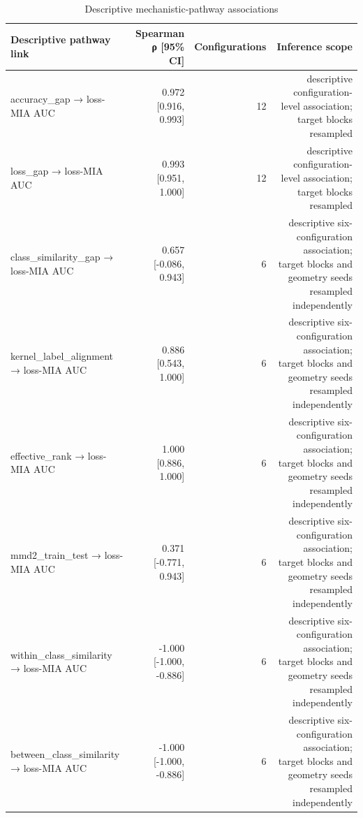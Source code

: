 \begin{table}
\caption{Descriptive mechanistic-pathway associations}
\label{tab:satml_pathway}
\begin{tabular}{lrrr}
\toprule
Descriptive pathway link & Spearman ρ [95\% CI] & Configurations & Inference scope \\
\midrule
accuracy\_gap → loss-MIA AUC & 0.972 [0.916, 0.993] & 12 & descriptive configuration-level association; target blocks resampled \\
loss\_gap → loss-MIA AUC & 0.993 [0.951, 1.000] & 12 & descriptive configuration-level association; target blocks resampled \\
class\_similarity\_gap → loss-MIA AUC & 0.657 [-0.086, 0.943] & 6 & descriptive six-configuration association; target blocks and geometry seeds resampled independently \\
kernel\_label\_alignment → loss-MIA AUC & 0.886 [0.543, 1.000] & 6 & descriptive six-configuration association; target blocks and geometry seeds resampled independently \\
effective\_rank → loss-MIA AUC & 1.000 [0.886, 1.000] & 6 & descriptive six-configuration association; target blocks and geometry seeds resampled independently \\
mmd2\_train\_test → loss-MIA AUC & 0.371 [-0.771, 0.943] & 6 & descriptive six-configuration association; target blocks and geometry seeds resampled independently \\
within\_class\_similarity → loss-MIA AUC & -1.000 [-1.000, -0.886] & 6 & descriptive six-configuration association; target blocks and geometry seeds resampled independently \\
between\_class\_similarity → loss-MIA AUC & -1.000 [-1.000, -0.886] & 6 & descriptive six-configuration association; target blocks and geometry seeds resampled independently \\
\bottomrule
\end{tabular}
\end{table}


